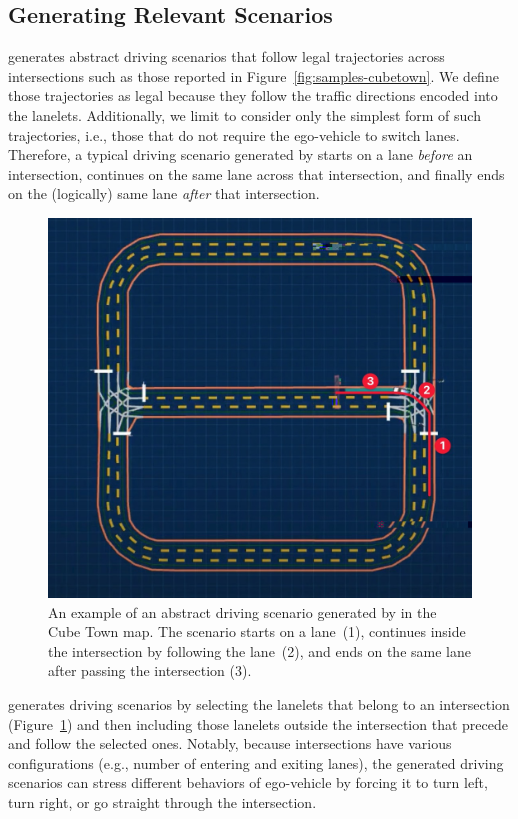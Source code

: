 \documentclass[conference]{IEEEtran}
\begin{document}
\subsection{Generating Relevant Scenarios}
\tool generates abstract driving scenarios that follow legal trajectories across intersections such as those reported in Figure~\ref{fig:samples-cubetown}. We define those trajectories as legal because they follow the traffic directions encoded into the lanelets. Additionally, we limit \tool to consider only the simplest form of such trajectories, i.e., those that do not require the ego-vehicle to switch lanes. Therefore, a typical driving scenario generated by \tool starts on a lane \emph{before} an intersection, continues on the same lane across that intersection, and finally ends on the (logically) same lane \emph{after} that intersection.
%
\begin{figure}
 \centering
  \includegraphics[width=\columnwidth]{images/lanelet01}
 \caption{An example of an abstract driving scenario generated by \tool in the Cube Town map. The scenario  starts on a lane~(1), continues inside the intersection by following the lane~(2), and ends on the same lane after passing the intersection (3).}
 \label{fig:intersection_sf}
\end{figure}

\tool generates driving scenarios by selecting the lanelets that belong to an intersection (Figure~\ref{fig:intersection_sf}) and then including those lanelets outside the intersection that precede and follow the selected ones. Notably, because intersections have various configurations (e.g., number of entering and exiting lanes), the generated driving scenarios can stress different behaviors of ego-vehicle by forcing it to turn left, turn right, or go straight through the intersection.
\end{document}
